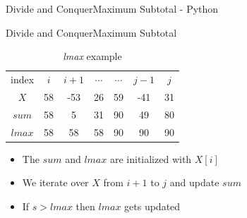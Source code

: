 {%

\begin{frame}{Divide and Conquer}{Maximum Subtotal - Python}
  \vspace{-0.5em}
  
\end{frame}
}



\begin{frame}{Divide and Conquer}{Maximum Subtotal}
  \begin{table}
    \caption{\textit{lmax} example}
    \label{fig:divide_and_conquer:lmax_example}
    \begin{tabular}{c|cccccc}
      index & $i$ & $i+1$ & $\cdots$ & $\cdots$ & $j-1$ & $j$\\
      $X$ & 58 & -53 & 26 & 59 & -41 & 31\\
       {\color{Mittel-Blau}$sum$} & 58 & 5 & 31 & 90 & 49 & 80\\
      {\color{Mittel-Blau}$lmax$} & 58 & 58 & 58 & 90 & 90 & 90\\
    \end{tabular}
  \end{table}
  \begin{itemize}
    \item<2->
      The {\color{Mittel-Blau}$sum$} and {\color{Mittel-Blau}$lmax$} are initialized with $X[i]$
    \item<3->
      We iterate over {\color{Mittel-Blau}$X$} from {\color{Mittel-Blau}$i+1$} to {\color{Mittel-Blau}$j$} and update {\color{Mittel-Blau}$sum$}
    \item<4->
      If {\color{Mittel-Blau}$s > lmax$} then {\color{Mittel-Blau}$lmax$}
      gets updated
  \end{itemize}
\end{frame}


